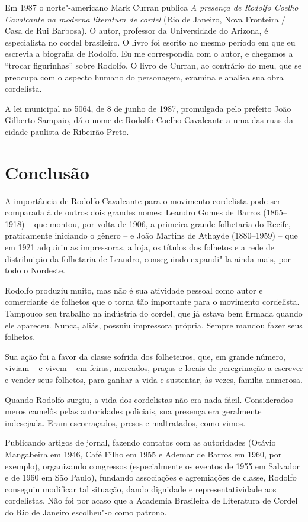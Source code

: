  Em 1987 o norte"-americano Mark Curran publica \textit{A presença de
Rodolfo Coelho Cavalcante na moderna literatura de cordel} (Rio de
Janeiro, Nova Fronteira / Casa de Rui Barbosa). O autor, professor da
Universidade do Arizona, é especialista no cordel brasileiro. O livro
foi escrito no mesmo período em que eu escrevia a biografia de Rodolfo.
Eu me correspondia com o autor, e chegamos a ``trocar
figurinhas'' sobre Rodolfo. O livro de Curran, ao
contrário do meu, que se preocupa com o aspecto humano do personagem,
examina e analisa sua obra cordelista. 

 A lei municipal no 5064, de 8 de junho de 1987, promulgada pelo
prefeito João Gilberto Sampaio, dá o nome de Rodolfo Coelho Cavalcante
a uma das ruas da cidade paulista de Ribeirão Preto. 

\section{Conclusão}

A importância de Rodolfo Cavalcante para o movimento cordelista pode ser
comparada à de outros dois grandes nomes: Leandro Gomes de Barros
(1865--1918) -- que montou, por volta de 1906, a primeira grande
folhetaria do Recife, praticamente iniciando o gênero -- e João
Martins de Athayde (1880--1959)  -- que em 1921 adquiriu as
impressoras, a loja, os títulos dos folhetos e a rede de distribuição
da folhetaria de Leandro, conseguindo expandi"-la ainda mais, por todo
o Nordeste. 

 Rodolfo produziu muito, mas não é sua atividade pessoal como autor e
comerciante de folhetos que o torna tão importante para o movimento
cordelista. Tampouco seu trabalho na indústria do cordel, que já estava
bem firmada quando ele apareceu. Nunca, aliás, possuiu impressora
própria. Sempre mandou fazer seus folhetos. 

 Sua ação foi a favor da classe sofrida dos folheteiros, que, em grande
número, viviam -- e vivem -- em feiras, mercados, praças e locais
de peregrinação a escrever e vender seus folhetos, para ganhar a vida e
sustentar, às vezes, família numerosa. 

 Quando Rodolfo surgiu, a vida dos cordelistas não era nada fácil.
Considerados meros camelôs pelas autoridades policiais, sua presença
era geralmente indesejada. Eram escorraçados, presos e maltratados,
como vimos. 

 Publicando artigos de jornal, fazendo contatos com as autoridades
(Otávio Mangabeira em 1946, Café Filho em 1955 e Ademar de Barros em
1960, por exemplo), organizando congressos (especialmente os eventos de
1955 em Salvador e de 1960 em São Paulo), fundando associações e
agremiações de classe, Rodolfo conseguiu modificar tal situação, dando
dignidade e representatividade aos cordelistas. Não foi por acaso que a
Academia Brasileira de Literatura de Cordel do Rio de Janeiro
escolheu"-o como patrono. 

